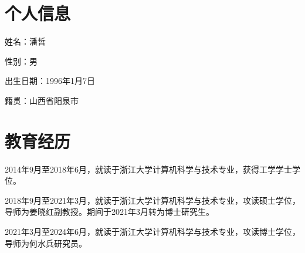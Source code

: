 \cleardoublepage
{}

\section*{个人信息}

姓名：潘哲

性别：男

出生日期：1996年1月7日

籍贯：山西省阳泉市


\section*{教育经历}

2014年9月至2018年6月，就读于浙江大学计算机科学与技术专业，获得工学学士学位。

2018年9月至2021年3月，就读于浙江大学计算机科学与技术专业，攻读硕士学位，导师为姜晓红副教授。期间于2021年3月转为博士研究生。

2021年3月至2024年6月，就读于浙江大学计算机科学与技术专业，攻读博士学位，导师为何水兵研究员。